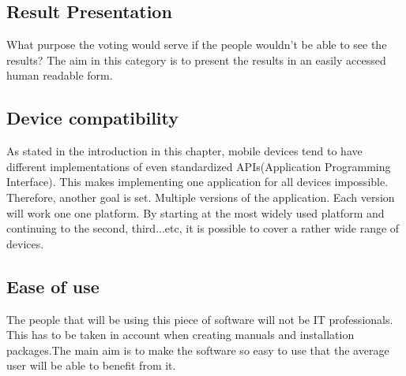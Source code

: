 \documentclass[11pt,twoside,a4paper]{book}
\begin{document}
\subsection{Result Presentation}
What purpose the voting would serve if the people wouldn't be able to see the results? The aim in this category is to present the results in an easily accessed human readable form.
\subsection{Device compatibility}
As stated in the introduction in this chapter, mobile devices tend to have different implementations of even standardized APIs(Application Programming Interface). This makes implementing one application for all devices impossible. Therefore, another goal is set. Multiple versions of the application. Each version will work one one platform. By starting at the most widely used platform and continuing to the second, third...etc, it is possible to cover a rather wide range of devices.
\subsection{Ease of use}
The people that will be using this piece of software will not be IT professionals. This has to be taken in account when creating manuals and installation packages.The main aim is to make the software so easy to use that the average user will be able to benefit from it.
%







\end{document}
